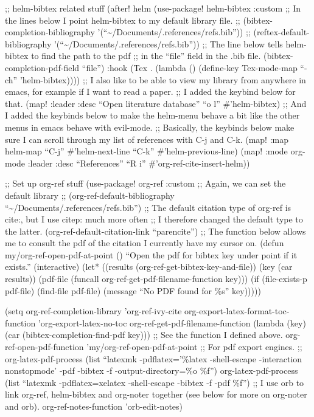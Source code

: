 \documentclass[11pt]{article}
\begin{document}
;; helm-bibtex related stuff
(after! helm
  (use-package! helm-bibtex
    :custom
    ;; In the lines below I point helm-bibtex to my default library file.
    ;; (bibtex-completion-bibliography '(``\textasciitilde{}/Documents/.references/refs.bib''))
    ;; (reftex-default-bibliography '(``\textasciitilde{}/Documents/.references/refs.bib''))
    ;; The line below tells helm-bibtex to find the path to the pdf
    ;; in the ``file'' field in the .bib file.
    (bibtex-completion-pdf-field ``file'')
    :hook (Tex . (lambda () (define-key Tex-mode-map ``\C-ch'' 'helm-bibtex))))
  ;; I also like to be able to view my library from anywhere in emacs, for example if I want to read a paper.
  ;; I added the keybind below for that.
  (map! :leader
        :desc ``Open literature database''
        ``o l'' \#'helm-bibtex)
  ;; And I added the keybinds below to make the helm-menu behave a bit like the other menus in emacs behave with evil-mode.
  ;; Basically, the keybinds below make sure I can scroll through my list of references with C-j and C-k.
  (map! :map helm-map
        ``C-j'' \#'helm-next-line
        ``C-k'' \#'helm-previous-line)
  (map! :mode org-mode
        :leader
        :desc ``References''
        ``R i'' \#'org-ref-cite-insert-helm))

;; Set up org-ref stuff
(use-package! org-ref
    :custom
    ;; Again, we can set the default library
    ;; (org-ref-default-bibliography ``\textasciitilde{}/Documents/.references/refs.bib'')
    ;; The default citation type of org-ref is cite:, but I use citep: much more often
    ;; I therefore changed the default type to the latter.
    (org-ref-default-citation-link ``parencite'')
 ;; The function below allows me to consult the pdf of the citation I currently have my cursor on.
 (defun my/org-ref-open-pdf-at-point ()
  ``Open the pdf for bibtex key under point if it exists.''
  (interactive)
  (let* ((results (org-ref-get-bibtex-key-and-file))
         (key (car results))
         (pdf-file (funcall org-ref-get-pdf-filename-function key)))
    (if (file-exists-p pdf-file)
        (find-file pdf-file)
      (message ``No PDF found for \%s'' key)))))

(setq org-ref-completion-library 'org-ref-ivy-cite
      org-export-latex-format-toc-function 'org-export-latex-no-toc
      org-ref-get-pdf-filename-function
      (lambda (key) (car (bibtex-completion-find-pdf key)))
      ;; See the function I defined above.
      org-ref-open-pdf-function 'my/org-ref-open-pdf-at-point
      ;; For pdf export engines.
      ;; org-latex-pdf-process (list ``latexmk -pdflatex='\%latex -shell-escape -interaction nonstopmode' -pdf -bibtex -f -output-directory=\%o \%f'')
      org-latex-pdf-process (list ``latexmk -pdflatex=xelatex -shell-escape -bibtex -f -pdf \%f'')
      ;; I use orb to link org-ref, helm-bibtex and org-noter together (see below for more on org-noter and orb).
      org-ref-notes-function 'orb-edit-notes)
\end{document}
